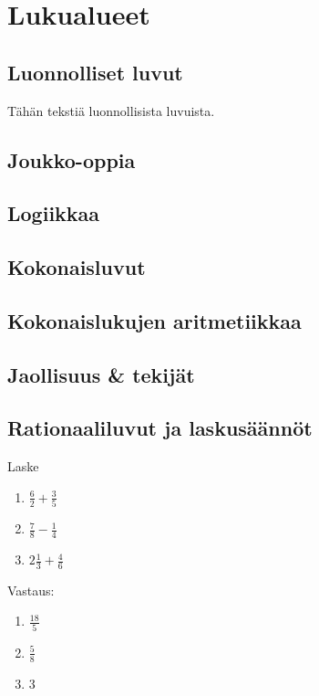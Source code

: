 


\part{Lukualueet}
\chapter{Luonnolliset luvut}

Tähän tekstiä luonnollisista luvuista.

\chapter{Joukko-oppia}
\chapter{Logiikkaa}
\chapter{Kokonaisluvut}
\chapter{Kokonaislukujen aritmetiikkaa}
\chapter{Jaollisuus \& tekijät}
\chapter{Rationaaliluvut ja laskusäännöt}

\begin{tehtava}
Laske %
\begin{enumerate}
\item $\frac{6}{2} + \frac{3}{5}$
\item $\frac{7}{8} - \frac{1}{4}$
\item $2 \frac{1}{3} + \frac{4}{6}$
\end{enumerate}
\begin{vastaus}
Vastaus:
\begin{enumerate}
\item $\frac{18}{5}$
\item $\frac{5}{8}$
\item $3$
\end{enumerate}
\end{vastaus}
\end{tehtava}

